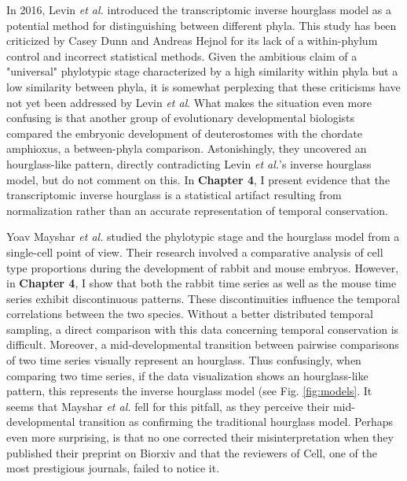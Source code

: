 In 2016, Levin \textit{et al.} introduced the transcriptomic inverse hourglass model as a potential method for distinguishing between different phyla\cite{Levin2016}. This study has been criticized by Casey Dunn and Andreas Hejnol for its lack of a within-phylum control\cite{hejnol2016} and incorrect statistical methods\cite{Dunn2018}. Given the ambitious claim of a "universal" phylotypic stage characterized by a high similarity within phyla but a low similarity between phyla, it is somewhat perplexing that these criticisms have not yet been addressed by Levin \textit{et al}. What makes the situation even more confusing is that another group of evolutionary developmental biologists compared the embryonic development of deuterostomes with the chordate amphioxus, a between-phyla comparison. Astonishingly, they uncovered an hourglass-like pattern\cite{PerezPosada2022}, directly contradicting Levin \textit{et al.}'s inverse hourglass model, but do not comment on this. In \textbf{Chapter 4}, I present evidence that the transcriptomic inverse hourglass is a statistical artifact resulting from normalization rather than an accurate representation of temporal conservation. 

Yoav Mayshar \textit{et al.} studied the phylotypic stage and the hourglass model from a single-cell point of view\cite{Mayshar2023}. Their research involved a comparative analysis of cell type proportions during the development of rabbit and mouse embryos. However, in \textbf{Chapter 4}, I show that both the rabbit time series as well as the mouse time series exhibit discontinuous patterns. These discontinuities influence the temporal correlations between the two species. Without a better distributed temporal sampling, a direct comparison with this data concerning temporal conservation is difficult. Moreover, a mid-developmental transition between pairwise comparisons of two time series visually represent an hourglass. Thus confusingly, when comparing two time series, if the data visualization shows an hourglass-like pattern, this represents the inverse hourglass model (see Fig. \ref{fig:models}. It seems that Mayshar \textit{et al.} fell for this pitfall, as they perceive their mid-developmental transition as confirming the traditional hourglass model. Perhaps even more surprising, is that no one corrected their misinterpretation when they published their preprint on Biorxiv and that the reviewers of Cell, one of the most prestigious journals, failed to notice it.

